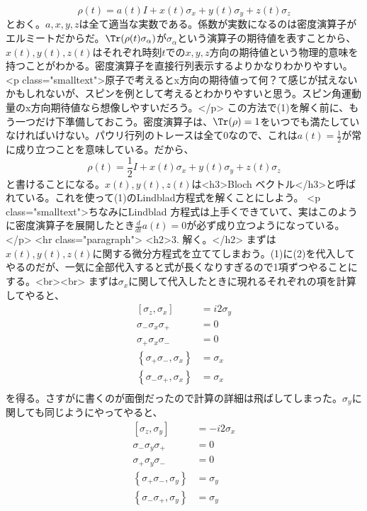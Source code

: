 \[\rho(t) = a(t)I + x(t)\sigma_x + y(t)\sigma_y + z(t)\sigma_z\]
とおく。\(a,x,y,z\)は全て適当な実数である。係数が実数になるのは密度演算子がエルミートだからだ。\(\Tr(\rho(t)\sigma_\alpha)\)が\(\sigma_\alpha\)という演算子の期待値を表すことから、\(x(t),y(t),z(t)\)はそれぞれ時刻\(t\)での\(x,y,z\)方向の期待値という物理的意味を持つことがわかる。密度演算子を直接行列表示するよりかなりわかりやすい。
<p class="smalltext">原子で考えるとx方向の期待値って何？て感じが拭えないかもしれないが、スピンを例として考えるとわかりやすいと思う。スピン角運動量のx方向期待値なら想像しやすいだろう。</p>
この方法で(1)を解く前に、もう一つだけ下準備しておこう。密度演算子は、\(\Tr(\rho)=1\)をいつでも満たしていなければいけない。パウリ行列のトレースは全て0なので、これは\(a(t) = \frac{1}{2}\)が常に成り立つことを意味している。だから、
\[\rho(t) = \frac{1}{2}I + x(t)\sigma_x + y(t)\sigma_y + z(t)\sigma_z\tag{2}\]
と書けることになる。\(x(t),y(t),z(t)\)は<h3>Bloch ベクトル</h3>と呼ばれている。これを使って(1)のLindblad方程式を解くことにしよう。
<p class="smalltext">ちなみにLindblad 方程式は上手くできていて、実はこのように密度演算子を展開したとき\(\frac{d}{dt}a(t) = 0\)が必ず成り立つようになっている。</p>
<hr class="paragraph">
<h2>3. 解く。</h2>
まずは\(x(t),y(t),z(t)\)に関する微分方程式を立ててしまおう。(1)に(2)を代入してやるのだが、一気に全部代入すると式が長くなりすぎるので1項ずつやることにする。<br><br>
まずは\(\sigma_x\)に関して代入したときに現れるそれぞれの項を計算してやると、
\begin{align}
\left[\sigma_z,\sigma_x\right] &= i2\sigma_y \\
\sigma_-\sigma_x\sigma_+ &= 0 \\
\sigma_+\sigma_x\sigma_- &= 0 \\
\left\{\sigma_+ \sigma_- , \sigma_x\right\} &= \sigma_x \\
\left\{\sigma_- \sigma_+ , \sigma_x\right\} &= \sigma_x \\
\end{align}
を得る。さすがに書くのが面倒だったので計算の詳細は飛ばしてしまった。\(\sigma_y\)に関しても同じようにやってやると、
\begin{align}
\left[\sigma_z,\sigma_y\right] &= -i2\sigma_x \\
\sigma_-\sigma_y\sigma_+ &= 0 \\
\sigma_+\sigma_y\sigma_- &= 0 \\
\left\{\sigma_+ \sigma_- , \sigma_y\right\} &= \sigma_y \\
\left\{\sigma_- \sigma_+ , \sigma_y\right\} &= \sigma_y \\
\end{align}
